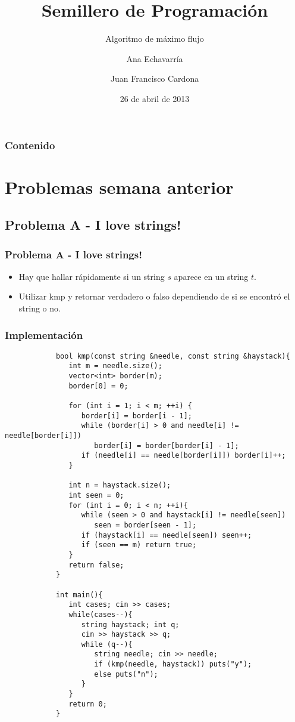 \documentclass{beamer}
\title{Semillero de Programación}
\subtitle{Algoritmo de máximo flujo}
\author{Ana Echavarría \and Juan Francisco Cardona}
\institute{Universidad EAFIT}
\date{26 de abril de 2013}
\begin{document}
\begin{frame}
	\titlepage
\end{frame}

\begin{frame}
	\frametitle{Contenido}
	\tableofcontents
\end{frame}

\section[Problemas]{Problemas semana anterior}
	\subsection{Problema A - I love strings!}
	
	\begin{frame}
		\frametitle{Problema A - I love strings!}
		\begin{itemize}
			\item Hay que hallar rápidamente si un string $s$ aparece en un string $t$.
			\item Utilizar kmp y retornar verdadero o falso dependiendo de si se encontró el string o no.
		\end{itemize}
	\end{frame}
	
	\begin{frame}
		\frametitle{Implementación}
		\begin{lstlisting}
			bool kmp(const string &needle, const string &haystack){
			   int m = needle.size();
			   vector<int> border(m);
			   border[0] = 0;

			   for (int i = 1; i < m; ++i) {
			      border[i] = border[i - 1];
			      while (border[i] > 0 and needle[i] != needle[border[i]])
			         border[i] = border[border[i] - 1];
			      if (needle[i] == needle[border[i]]) border[i]++;
			   }

			   int n = haystack.size();
			   int seen = 0;
			   for (int i = 0; i < n; ++i){
			      while (seen > 0 and haystack[i] != needle[seen])
			         seen = border[seen - 1];
			      if (haystack[i] == needle[seen]) seen++;
			      if (seen == m) return true;
			   }
			   return false;
			}

			int main(){
			   int cases; cin >> cases;
			   while(cases--){
			      string haystack; int q;
			      cin >> haystack >> q;
			      while (q--){
			         string needle; cin >> needle;
			         if (kmp(needle, haystack)) puts("y");
			         else puts("n");
			      }
			   }
			   return 0;
			}
		\end{lstlisting}
	\end{frame}
	
\end{document}
